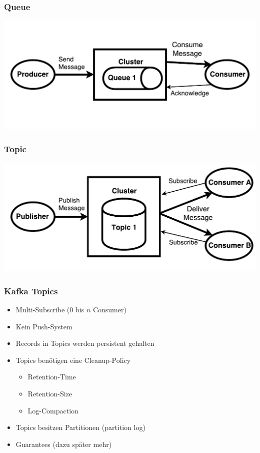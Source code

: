 \begin{frame}
\frametitle{Queue}
\begin{center}
	\centering
	\includegraphics[scale=0.6]{figure/queue_draw.pdf}
\end{center}
\end{frame}

\begin{frame}
\frametitle{Topic}
	\centering
	\includegraphics[scale=0.6]{figure/topic_draw.pdf}
\end{frame}

\begin{frame}
\frametitle{Kafka Topics}
\begin{itemize}
	\item Multi-Subscribe ($0$ bis $n$ Consumer)		%
	\item Kein Push-System
	\item Records in Topics werden persistent gehalten
	\item Topics benötigen eine Cleanup-Policy
		\begin{itemize}
			\item Retention-Time
			\item Retention-Size
			\item Log-Compaction
		\end{itemize}
	\item Topics besitzen Partitionen (partition log)
	\item Guarantees (dazu später mehr)
\end{itemize}
\end{frame}

